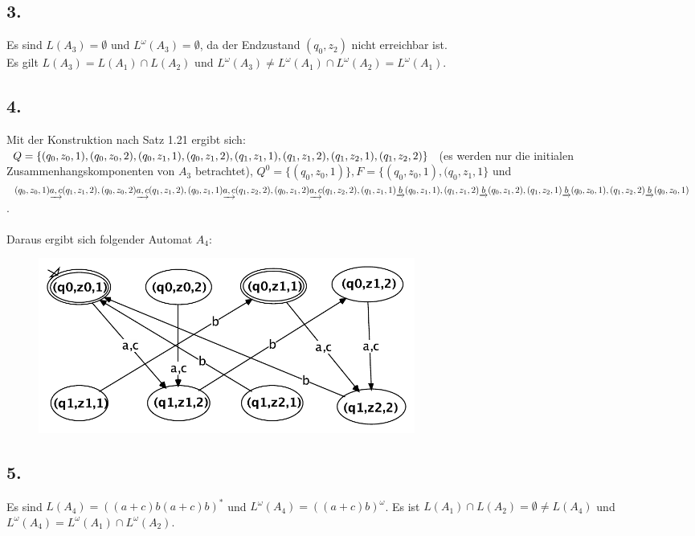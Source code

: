 \documentclass[12pt, paper=a4]{article}
\begin{document}
\subsection*{3.}	
	Es sind \(L(A_3)=\emptyset\) und \(L^\omega(A_3)=\emptyset\),
	da der Endzustand \((q_0,z_2)\) nicht erreichbar ist.\\
	Es gilt \(L(A_3)=L(A_1)\cap L(A_2)\) und 
	\(L^\omega(A_3)\neq L^\omega(A_1)\cap L^\omega(A_2)=L^\omega(A_1)\).
	
\subsection*{4.}	
	Mit der Konstruktion nach Satz 1.21 ergibt sich:\\
	\(Q=\{(q_0,z_0,1),(q_0,z_0,2),(q_0,z_1,1),(q_0,z_1,2),(q_1,z_1,1),(q_1,z_1,2),(q_1,z_2,1),\\(q_1,z_2,2)\}\) 
	(es werden nur die initialen Zusammenhangskomponenten von \(A_3\) betrachtet),
	\(Q^0=\{(q_0,z_0,1)\}, F=\{(q_0,z_0,1),(q_0,z_1,1\} \) und \\
	\((q_0,z_0,1)\underrightarrow{a,c}(q_1,z_1,2),(q_0,z_0,2)\underrightarrow{a,c}(q_1,z_1,2),
	(q_0,z_1,1)\underrightarrow{a,c}(q_1,z_2,2),\\(q_0,z_1,2)\underrightarrow{a,c}(q_1,z_2,2),
	(q_1,z_1,1)\underrightarrow{b}(q_0,z_1,1), (q_1,z_1,2)\underrightarrow{b}(q_0,z_1,2),\\
	(q_1,z_2,1)\underrightarrow{b}(q_0,z_0,1),(q_1,z_2,2)\underrightarrow{b}(q_0,z_0,1)\).\\
	\\
	Daraus ergibt sich folgender Automat \(A_4\): \\
	\begin {figure}[h]
  		\centering \includegraphics[width=0.6\textwidth]{A4}
	\end {figure}
	
\subsection*{5.}
	Es sind \(L(A_4)=((a+c)b(a+c)b)^*\) und \(L^\omega(A_4)=((a+c)b)^\omega\).
	Es ist \(L(A_1)\cap L(A_2)=\emptyset \neq L(A_4)\) und
	\(L^\omega(A_4) = L^\omega(A_1)\cap L^\omega(A_2)\).
\end{document}
